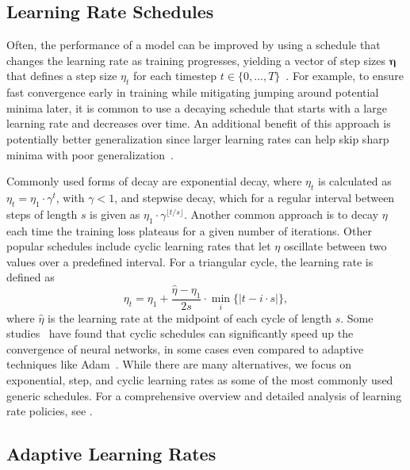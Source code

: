 \documentclass{article} %
\begin{document}
\subsection{Learning Rate Schedules}

Often, the performance of a model can be improved by using a schedule that changes the learning rate as training progresses, yielding a vector of step sizes $\bm{\eta}$ that defines a step size $\eta_t$ for each timestep $t \in \{0, \ldots, T\}$~\citep{wuDemystifyingLearningRate2019b}.
For example, to ensure fast convergence early in training while mitigating jumping around potential minima later, it is common to use a decaying schedule that starts with a large learning rate and decreases over time.
An additional benefit of this approach is potentially better generalization since larger learning rates can help skip sharp minima with poor generalization~\citep{hochreiterFlatMinima1997,chaudhariEntropySGDBiasingGradient2017}.

Commonly used forms of decay are exponential decay, where $\eta_{t}$ is calculated as
$\eta_{t} = \eta_1 \cdot \gamma^t$,
with $\gamma < 1$, and stepwise decay, which for a regular interval between steps of length $s$ is given as $\eta_1 \cdot \gamma^{\lfloor t/s \rfloor}$.
Another common approach is to decay $\eta$ each time the training loss plateaus for a given number of iterations. Other popular schedules include cyclic learning rates that let $\eta$ oscillate between two values over a predefined interval.
For a triangular cycle, the learning rate is defined as
\begin{equation}
   \eta_t = \eta_1 + \frac{\hat{\eta} - \eta_1}{2s} \cdot \min_{i} \{|t-i\cdot s|\},
\end{equation}
where $\hat{\eta}$ is the learning rate at the midpoint of each cycle of length $s$.
Some studies~\citep{smithCyclicalLearningRates2017, smithSuperConvergenceVeryFast2018a} have found that cyclic schedules can significantly speed up the convergence of neural networks, in some cases even compared to adaptive techniques like Adam~\citep{kingmaAdamMethodStochastic2017b}.
While there are many alternatives, we focus on exponential, step, and cyclic learning rates as some of the most commonly used generic schedules.
For a comprehensive overview and detailed analysis of learning rate policies, see \citet{wuDemystifyingLearningRate2019b}.

\subsection{Adaptive Learning Rates}
\end{document}
